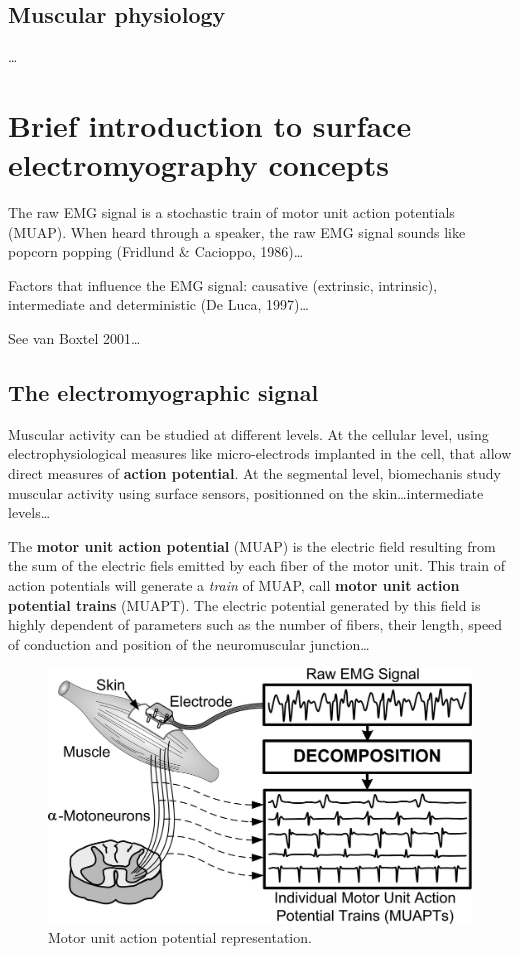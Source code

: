 \documentclass[a4paper,12pt,twoside,openright,oldfontcommands]{memoir}
\begin{document}
\subsection{Muscular physiology}\label{muscular-physiology}

\ldots{}

\section{Brief introduction to surface electromyography
concepts}\label{brief-introduction-to-surface-electromyography-concepts}

The raw EMG signal is a stochastic train of motor unit action potentials
(MUAP). When heard through a speaker, the raw EMG signal sounds like
popcorn popping (Fridlund \& Cacioppo, 1986)\ldots{}

Factors that influence the EMG signal: causative (extrinsic, intrinsic),
intermediate and deterministic (De Luca, 1997)\ldots{}

See van Boxtel 2001\ldots{}

\subsection{The electromyographic
signal}\label{the-electromyographic-signal}

Muscular activity can be studied at different levels. At the cellular
level, using electrophysiological measures like micro-electrods
implanted in the cell, that allow direct measures of \textbf{action
potential}. At the segmental level, biomechanis study muscular activity
using surface sensors, positionned on the skin\ldots{}intermediate
levels\ldots{}

The \textbf{motor unit action potential} (MUAP) is the electric field
resulting from the sum of the electric fiels emitted by each fiber of
the motor unit. This train of action potentials will generate a
\emph{train} of MUAP, call \textbf{motor unit action potential trains}
(MUAPT). The electric potential generated by this field is highly
dependent of parameters such as the number of fibers, their length,
speed of conduction and position of the neuromuscular junction\ldots{}

\begin{figure}

{\centering \includegraphics[width=0.75\linewidth]{assets/muap} 

}

\caption{Motor unit action potential representation.}\label{fig:muap}
\end{figure}
\end{document}

